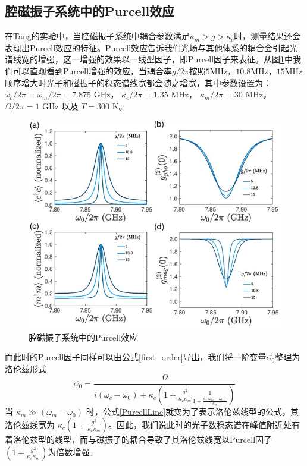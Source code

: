 \subsection{腔磁振子系统中的Purcell效应}
在Tang的实验中，当腔磁振子系统中耦合参数满足$\kappa_m>g>\kappa_c$时，测量结果还会表现出Purcell效应的特征。Purcell效应告诉我们光场与其他体系的耦合会引起光谱线宽的增强，这一增强的效果以一线型因子，即Purcell因子来表征。从图\ref{PurcellgVary}中我们可以直观看到Purcell增强的效应，当耦合率$g/2\pi$按照$5$MHz，$10.8$MHz，$15$MHz顺序增大时光子和磁振子的稳态谱线宽都会随之增宽，其中参数设置为：$\omega_c/2\pi=\omega_m/2\pi=7.875$ GHz， $\kappa_c/2\pi=1.35$ MHz， $\kappa_m/2\pi=30$ MHz， $\Omega/2\pi=1$ GHz 以及 $T=300$ K。
\begin{figure}[htbp]
	\centering
	\includegraphics[width=1.9\basefigurewidth,clip]{./figure/4_8}
	\caption{腔磁振子系统中的Purcell效应} 
	\label{PurcellgVary}
\end{figure}
而此时的Purcell因子同样可以由公式\eqref{first_order}导出，我们将一阶变量$\overline{\alpha_{0}}$整理为洛伦兹形式
\begin{equation}
\overline{\alpha_{0}}=\frac{\Omega}{i(\omega_{c}-\omega_{0})+\kappa_{c}\left(1+\frac{g^{2}}{\kappa_{c}\kappa_{m}}\frac{1}{1+\frac{i(\omega_{m}-\omega_{0})}{\kappa_{m}}}\right)}
\label{PurcellLine}
\end{equation}
当 $\kappa_m\gg(\omega_{m}-\omega_{0})$ 时，公式\eqref{PurcellLine}就变为了表示洛伦兹线型的公式，其洛伦兹线宽为 $\kappa_c(1+\frac{g^{2}}{\kappa_{c}\kappa_{m}})$。因此，我们说此时的光子数稳态谱在峰值附近处有着洛伦兹型的线型，而与磁振子的耦合导致了其洛伦兹线宽以Purcell因子$(1+\frac{g^{2}}{\kappa_{c}\kappa_{m}})$为倍数增强。

